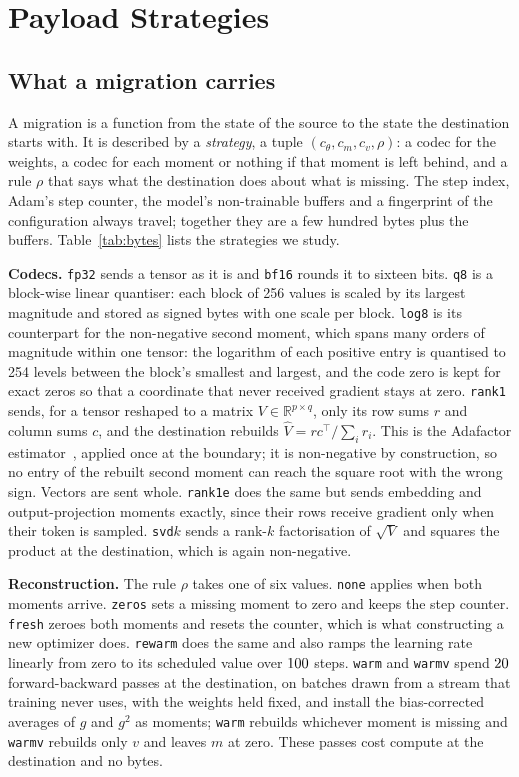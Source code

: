 \section{Payload Strategies}
\label{sec:method}

\subsection{What a migration carries}

A migration is a function from the state of the source to the state the destination starts with. It is described by
a \emph{strategy}, a tuple $(c_\theta, c_m, c_v, \rho)$: a codec for the weights, a codec for each moment or nothing if
that moment is left behind, and a rule $\rho$ that says what the destination does about what is missing. The step
index, Adam's step counter, the model's non-trainable buffers and a fingerprint of the configuration always travel;
together they are a few hundred bytes plus the buffers. Table~\ref{tab:bytes} lists the strategies we study.

\textbf{Codecs.} \texttt{fp32} sends a tensor as it is and \texttt{bf16} rounds it to sixteen bits. \texttt{q8} is a
block-wise linear quantiser: each block of 256 values is scaled by its largest magnitude and stored as signed bytes with
one scale per block. \texttt{log8} is its counterpart for the non-negative second moment, which spans many orders of
magnitude within one tensor: the logarithm of each positive entry is quantised to 254 levels between the block's
smallest and largest, and the code zero is kept for exact zeros so that a coordinate that never received gradient
stays at zero. \texttt{rank1} sends, for a tensor reshaped to a matrix $V \in \mathbb{R}^{p \times q}$, only its row
sums $r$ and column sums $c$, and the destination rebuilds $\hat V = r c^{\top} / \sum_i r_i$. This is the Adafactor
estimator~\cite{shazeer2018adafactor}, applied once at the boundary; it is non-negative by construction, so no entry of
the rebuilt second moment can reach the square root with the wrong sign. Vectors are sent whole. \texttt{rank1e} does
the same but sends embedding and output-projection moments exactly, since their rows receive gradient only when their
token is sampled. \texttt{svd}$k$ sends a rank-$k$ factorisation of $\sqrt{V}$ and squares the product at the
destination, which is again non-negative.

\textbf{Reconstruction.} The rule $\rho$ takes one of six values. \texttt{none} applies when both moments arrive.
\texttt{zeros} sets a missing moment to zero and keeps the step counter. \texttt{fresh} zeroes both moments and resets
the counter, which is what constructing a new optimizer does. \texttt{rewarm} does the same and also ramps the learning
rate linearly from zero to its scheduled value over $100$ steps. \texttt{warm} and \texttt{warmv} spend
$20$ forward-backward passes at the destination, on batches drawn from a stream that training never uses,
with the weights held fixed, and install the bias-corrected averages of $g$ and $g^2$ as moments; \texttt{warm}
rebuilds whichever moment is missing and \texttt{warmv} rebuilds only $v$ and leaves $m$ at zero. These passes cost
compute at the destination and no bytes.

